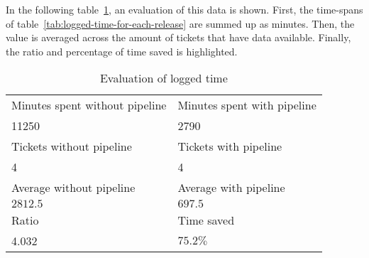 In the following table\ \ref{tab:evaluation-of-logged-time}, an evaluation of this data is shown.
First, the time-spans of table\ \ref{tab:logged-time-for-each-release} are summed up as minutes.
Then, the value is averaged across the amount of tickets that have data available.
Finally, the ratio and percentage of time saved is highlighted.

\begin{table}[h]
    \centering
    \caption{Evaluation of logged time}
    \label{tab:evaluation-of-logged-time}
    \begin{tabular}{|l|l|}
        Minutes spent without pipeline & Minutes spent with pipeline \\
        11250 & 2790 \\
        \hline
        Tickets without pipeline & Tickets with pipeline \\
        4 & 4 \\
        \hline
        Average without pipeline & Average with pipeline \\
        $2812.5$ & $697.5$ \\
        \hline
        Ratio & Time saved \\
        4.032 & $75.2 \%$ \\
    \end{tabular}
\end{table}

